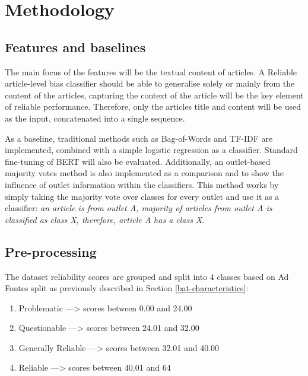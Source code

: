 \chapter{Methodology}
\label{cha:5}

\section{Features and baselines}

The main focus of the features will be the textual content of articles. A Reliable article-level bias classifier should be able to generalise solely or mainly from the content of the articles, capturing the context of the article will be the key element of reliable performance. Therefore, only the articles title and content will be used as the input, concatenated into a single sequence.

As a baseline, traditional methods such as Bag-of-Words and TF-IDF are implemented, combined with a simple logistic regression as a classifier. Standard fine-tuning of BERT will also be evaluated. Additionally, an outlet-based majority votes method is also implemented as a comparison and to show the influence of outlet information within the classifiers. This method works by simply taking the majority vote over classes for every outlet and use it as a classifier: \textit{an article is from outlet A, majority of articles from outlet A is classified as class X, therefore, article A has a class X}.

\section{Pre-processing}

The dataset reliability scores are grouped and split into 4 classes based on Ad Fontes split as previously described in Section \ref{bat-characteristics}:
\begin{enumerate}
    \item Problematic ---> scores between 0.00 and 24.00
    \item Questionable ---> scores between 24.01 and 32.00
    \item Generally Reliable ---> scores between 32.01 and 40.00
    \item Reliable ---> scores between 40.01 and 64
\end{enumerate}


